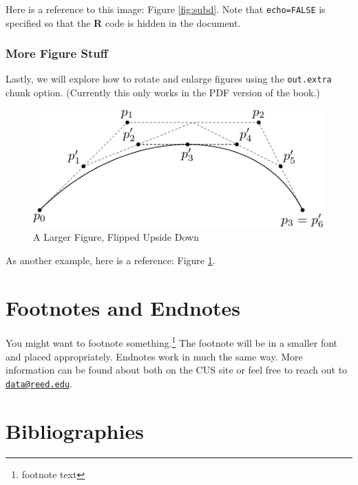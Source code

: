 \documentclass[12pt,twoside]{reedthesis}
\begin{document}
  Here is a reference to this image: Figure \ref{fig:subd}. Note that
  \texttt{echo=FALSE} is specified so that the \textbf{R} code is hidden
  in the document.
  
  \subsubsection{More Figure Stuff}\label{more-figure-stuff}
  
  Lastly, we will explore how to rotate and enlarge figures using the
  \texttt{out.extra} chunk option. (Currently this only works in the PDF
  version of the book.)
  
  \begin{figure}
  
  {\centering \includegraphics[angle=180, scale=1.1]{figure/subdivision} 
  
  }
  
  \caption[A Larger Figure, Flipped Upside Down]{A Larger Figure, Flipped Upside Down}\label{fig:subd2}
  \end{figure}
  
  As another example, here is a reference: Figure \ref{fig:subd2}.
  
  \section{Footnotes and Endnotes}\label{footnotes-and-endnotes}
  
  You might want to footnote something.\footnote{footnote text} The
  footnote will be in a smaller font and placed appropriately. Endnotes
  work in much the same way. More information can be found about both on
  the CUS site or feel free to reach out to
  \href{mailto:data@reed.edu}{\nolinkurl{data@reed.edu}}.
  
  \section{Bibliographies}\label{bibliographies}
  
\end{document}
